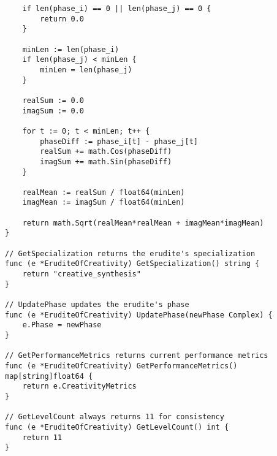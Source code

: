 \begin{tcolorbox}[colback=CodeBackground, colframe=DarkGray, title=Erudite of Creativity Implementation, fonttitle=\bfseries]
\begin{verbatim}
    if len(phase_i) == 0 || len(phase_j) == 0 {
        return 0.0
    }
    
    minLen := len(phase_i)
    if len(phase_j) < minLen {
        minLen = len(phase_j)
    }
    
    realSum := 0.0
    imagSum := 0.0
    
    for t := 0; t < minLen; t++ {
        phaseDiff := phase_i[t] - phase_j[t]
        realSum += math.Cos(phaseDiff)
        imagSum += math.Sin(phaseDiff)
    }
    
    realMean := realSum / float64(minLen)
    imagMean := imagSum / float64(minLen)
    
    return math.Sqrt(realMean*realMean + imagMean*imagMean)
}

// GetSpecialization returns the erudite's specialization
func (e *EruditeOfCreativity) GetSpecialization() string {
    return "creative_synthesis"
}

// UpdatePhase updates the erudite's phase
func (e *EruditeOfCreativity) UpdatePhase(newPhase Complex) {
    e.Phase = newPhase
}

// GetPerformanceMetrics returns current performance metrics
func (e *EruditeOfCreativity) GetPerformanceMetrics() map[string]float64 {
    return e.CreativityMetrics
}

// GetLevelCount always returns 11 for consistency
func (e *EruditeOfCreativity) GetLevelCount() int {
    return 11
}
\end{verbatim}
\end{tcolorbox}

